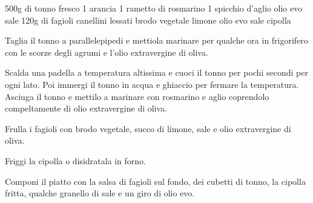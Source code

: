 \begin{ingreds}
	500g di tonno fresco
	1 arancia
	1 rametto di rosmarino
	1 spicchio d'aglio
	olio evo
	sale
\columnbreak
{}
	120g di fagioli canellini lessati
	brodo vegetale
	limone
	olio evo
	sale
	cipolla
\end{ingreds}

\begin{method}

	Taglia il tonno a parallelepipedi e mettiola marinare per qualche ora in frigorifero con le scorze degli agrumi e l'olio extravergine di oliva.

	Scalda una padella a temperatura altissima e cuoci il tonno per pochi secondi per ogni lato. Poi immergi il tonno in acqua e ghiaccio per fermare la temperatura. Asciuga il tonno e mettilo a marinare con rosmarino e aglio coprendolo compeltamente di olio extravergine di oliva.

	Frulla i fagioli con brodo vegetale, succo di limone, sale e olio extravergine di oliva.

	Friggi la cipolla o disidratala in forno.

	Componi il piatto con la salsa di fagioli sul fondo, dei cubetti di tonno, la cipolla fritta, qualche granello di sale e un giro di olio evo.
\end {method}
